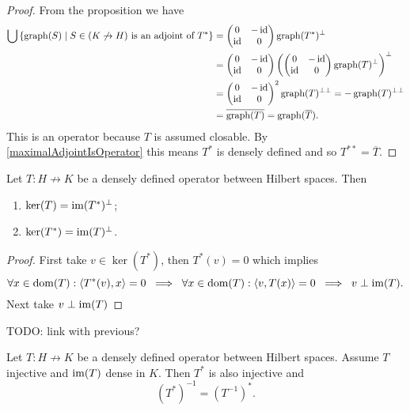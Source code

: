 \begin{proof}
From the proposition we have
\begin{align*}
\bigcup\left\{ \operatorname{graph}(S) \;\middle|\; \text{$S\in (K\not\to H)$ is an adjoint of $T^*$} \right\} &=  \begin{pmatrix}
0 & -\operatorname{id} \\ \operatorname{id} & 0
\end{pmatrix}\operatorname{graph}(T^*)^\perp \\
&=  \begin{pmatrix}
0 & -\operatorname{id} \\ \operatorname{id} & 0
\end{pmatrix}\left(\begin{pmatrix}
0 & -\operatorname{id} \\ \operatorname{id} & 0
\end{pmatrix}\operatorname{graph}(T)^\perp\right)^\perp \\
&= \begin{pmatrix}
0 & -\operatorname{id} \\ \operatorname{id} & 0
\end{pmatrix}^2\operatorname{graph}(T)^{\perp\perp} = -\operatorname{graph}(T)^{\perp\perp} \\
&= \overline{\operatorname{graph}(T)} = \operatorname{graph}(\overline{T}).
\end{align*}
This is an operator because $T$ is assumed closable. By \ref{maximalAdjointIsOperator} this means $T^*$ is densely defined and so $T^{**} = \overline{T}$.
\end{proof}

\begin{proposition} \label{kernelImageAdjoint}
Let $T: H\not\to K$ be a densely defined operator between Hilbert spaces. Then
\begin{enumerate}
\item $\ker(T) = \operatorname{im}(T^*)^\perp$;
\item $\ker(T^*) = \operatorname{im}(T)^\perp$.
\end{enumerate}
\end{proposition}
\begin{proof}
First take $v\in \ker(T^*)$, then $T^*(v) = 0$ which implies
\[ \forall x \in\operatorname{dom}(T): \left\langle T^*(v), x \right\rangle = 0 \;\implies\; \forall x \in\operatorname{dom}(T): \left\langle v, T(x) \right\rangle = 0 \;\implies\; v\perp \operatorname{im}(T).  \]
Next take $v\perp \operatorname{im}(T)$
\end{proof}
TODO: link with previous?

\begin{lemma}
Let $T: H\not\to K$ be a densely defined operator between Hilbert spaces. Assume $T$ injective and $\operatorname{im}(T)$ dense in $K$. Then $T^*$ is also injective and
\[ (T^*)^{-1} = (T^{-1})^*. \]
\end{lemma}

